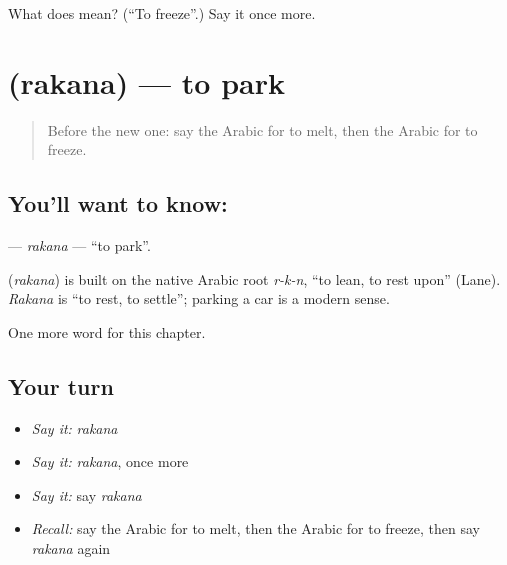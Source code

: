 \begin{tcolorbox}[breakable,colback=teal!4,colframe=teal!35!black,title={Before you move on}]
What does  mean? (\textquotedblleft{}To freeze\textquotedblright{}.) Say it once more.
\end{tcolorbox}
\section[\texorpdfstring{\ar{ركن} (rakana)}{ركن (rakana)}]{ (rakana) — to park}

\label{lesson:AR-C261-rakana}



\begin{quote}
Before the new one: say the Arabic for to melt, then the Arabic for to freeze.
\end{quote}

\subsection*{You'll want to know: }
\textbf{} — \emph{rakana} — \textquotedblleft{}to park\textquotedblright{}.

\begin{cousinweb}
\textbf{} (\emph{rakana}) is built on the native Arabic root \emph{r-k-n}, \textquotedblleft{}to lean, to rest upon\textquotedblright{} (Lane). \emph{Rakana} is \textquotedblleft{}to rest, to settle\textquotedblright{}; parking a car is a modern sense.
\end{cousinweb}

\begin{grammarlens}[title={What you've built}]
One more word for this chapter.
\end{grammarlens}

\subsection*{Your turn}
\begin{itemize}
\raggedright
  \item \emph{Say it:} \emph{rakana}
  \item \emph{Say it:} \emph{rakana}, once more
  \item \emph{Say it:} say \emph{rakana}
  \item \emph{Recall:} say the Arabic for to melt, then the Arabic for to freeze, then say \emph{rakana} again
\end{itemize}

